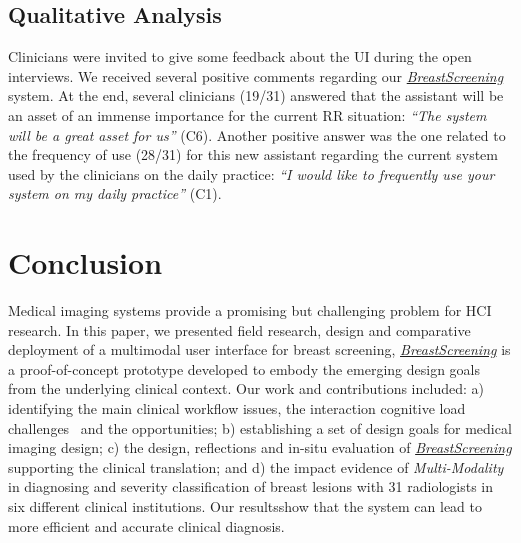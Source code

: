 \subsection{Qualitative Analysis}

Clinicians were invited to give some feedback about the UI during the open interviews.
We received several positive comments regarding our \href{https://breastscreening.github.io/}{{\it BreastScreening}} system.
At the end, several clinicians (19/31) answered that the assistant will be an asset of an immense importance for the current RR situation:
\textit{``The system will be a great asset for us''} (C6).
Another positive answer was the one related to the frequency of use (28/31) for this new assistant regarding the current system used by the clinicians on the daily practice:
\textit{``I would like to frequently use your system on my daily practice''} (C1). \section{Conclusion}
\label{sec:sec006}

Medical imaging systems provide a promising but challenging problem for HCI research.
In this paper, we presented field research, design and comparative deployment of a multimodal user interface for breast screening,
\href{https://breastscreening.github.io/}{{\it BreastScreening}} is a proof-of-concept prototype developed to embody the emerging design goals from the underlying clinical context.
Our work and contributions included:
a) identifying the main clinical workflow issues, the interaction cognitive load challenges~\cite{Castner:2018:ONG:3279810.3279845} and the opportunities;
b) establishing a set of design goals for medical imaging design;
c) the design, reflections and in-situ evaluation of \href{https://breastscreening.github.io/}{{\it BreastScreening}} supporting the clinical translation; and
d) the impact evidence of \textit{Multi-Modality} in diagnosing and severity classification of breast lesions with 31 radiologists in six different clinical institutions.
Our results\footnotemark[4] show that the system can lead to more efficient and accurate clinical diagnosis.


